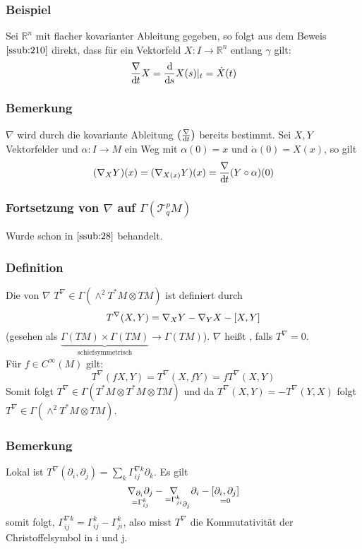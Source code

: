 \subsubsection{Beispiel}
\label{ssub:212}
Sei $\mathds{R}^n$ mit flacher kovarianter Ableitung gegeben, so folgt aus dem Beweis $\ref{ssub:210}$ direkt, dass für ein Vektorfeld $X:I\to \mathds{R}^n$ entlang $\gamma$ gilt:
\[
\frac{\nabla}{\mathd t} X = \frac{\mathd}{\mathd s} X(s)\vert_t = \dot{X}(t)
\]

\subsubsection{Bemerkung}
\label{ssub:213}
$\nabla$ wird durch die kovariante Ableitung $\enbrace*{\frac{\nabla}{\mathd t}}$ bereits bestimmt. Sei $X,Y$ Vektorfelder und $\alpha:I\to M$ ein Weg mit $\alpha(0) =  x$ und $\dot{\alpha}(0) = X(x)$, so gilt
\[
\enbrace{\nabla_X Y}(x) = \enbrace{\nabla_{X(x)} Y}(x) = \frac{\nabla}{\mathd t}\enbrace{Y\circ \alpha}(0)
\]

\subsubsection{Fortsetzung von $\nabla$ auf $\Gamma(\mathcal{T}_q^p M)$}
\label{ssub:214}
Wurde schon in $\ref{ssub:28}$ behandelt.

\subsubsection{Definition}
\label{ssub:215}
Die  von $\nabla$ $T^\nabla \in \Gamma(\wedge^2 T^* M \otimes TM)$ ist definiert durch 
\[
T^\nabla (X,Y) = \nabla_X Y - \nabla_Y X - \benbrace{X,Y}
\]
(gesehen als $\underbrace{\Gamma(TM)\times \Gamma(TM)}_{\text{schiefsymmetrisch}} \to \Gamma(TM)$). $\nabla$ heißt , falls $T^\nabla = 0$.\\
Für $f\in C^\infty(M)$ gilt:
\[
T^\nabla (fX,Y) = T^\nabla (X,fY) = f T^\nabla(X,Y)
\]
Somit folgt $T^\nabla \in \Gamma(T^* M \otimes T^* M \otimes TM)$ und da $T^\nabla (X,Y) = - T^\nabla (Y,X)$ folgt $T^\nabla \in \Gamma(\wedge^2 T^* M \otimes TM)$.

\subsubsection{Bemerkung}
\label{ssub:216}
Lokal ist $T^\nabla (\partial_i,\partial_j) = \sum_k \Gamma_{ij}^{\nabla k} \partial_k$. Es gilt
\[
\underset{= \Gamma_{ij}^k}{\nabla_{\partial_i} \partial_j} - \underset{= \Gamma_{ji}^k}\nabla_{\partial_j} \partial_i - \underset{= 0}{\benbrace{\partial_i,\partial_j}}
\]
somit folgt, $\Gamma_{ij}^{\nabla k} = \Gamma_{ij}^k - \Gamma_{ji}^k$, also misst $T^\nabla$ die Kommutativität der Christoffelsymbol in i und j.

